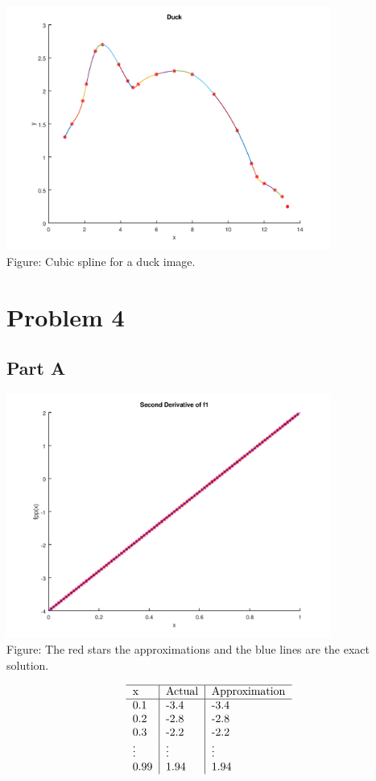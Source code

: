 \documentclass{article}
\begin{document}
\includegraphics[height=8cm]{problem3b.png}\\
Figure: Cubic spline for a duck image.

\section*{Problem 4}

\subsection*{Part A}
\includegraphics[height=8cm]{problem4a.png}\\
Figure: The red stars the approximations and the blue lines are the exact solution. 

$$\begin{tabular}{l | l | l } 
	\hline
	x & Actual & Approximation \\
	\hline
	0.1 &  -3.4 & -3.4  \\
	0.2 & -2.8 & -2.8 \\
	0.3 & -2.2 & -2.2\\
	\vdots & \vdots & \vdots \\
	0.99 & 1.94 & 1.94\\
\end{tabular}$$
\end{document}
